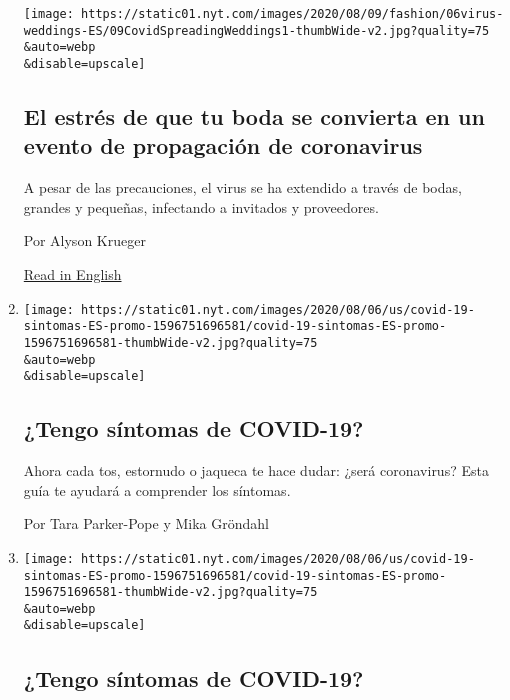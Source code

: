 \begin{enumerate}
  \texttt{[image: https://static01.nyt.com/images/2020/08/09/fashion/06virus-weddings-ES/09CovidSpreadingWeddings1-thumbWide-v2.jpg?quality=75\\\&auto=webp\\\&disable=upscale]}

  \hypertarget{el-estruxe9s-de-que-tu-boda-se-convierta-en-un-evento-de-propagaciuxf3n-de-coronavirus}{%
  \subsection{El estrés de que tu boda se convierta en un evento de
  propagación de
  coronavirus}\label{el-estruxe9s-de-que-tu-boda-se-convierta-en-un-evento-de-propagaciuxf3n-de-coronavirus}}

  A pesar de las precauciones, el virus se ha extendido a través de
  bodas, grandes y pequeñas, infectando a invitados y proveedores.

  Por Alyson Krueger

  \href{https://www.nytimes.com/2020/08/04/fashion/weddings/weddings-as-covid-super-spreaders.html}{Read
  in English}
\item
  \href{/es/interactive/2020/08/06/espanol/ciencia-y-tecnologia/tengo-covid-19-sintomas.html}{}

  \texttt{[image: https://static01.nyt.com/images/2020/08/06/us/covid-19-sintomas-ES-promo-1596751696581/covid-19-sintomas-ES-promo-1596751696581-thumbWide-v2.jpg?quality=75\\\&auto=webp\\\&disable=upscale]}

  \hypertarget{tengo-suxedntomas-de-covid-19-1}{%
  \subsection{¿Tengo síntomas de
  COVID-19?}\label{tengo-suxedntomas-de-covid-19-1}}

  Ahora cada tos, estornudo o jaqueca te hace dudar: ¿será coronavirus?
  Esta guía te ayudará a comprender los síntomas.

  Por Tara Parker-Pope y Mika Gröndahl
\item
  \href{/es/interactive/2020/08/06/espanol/ciencia-y-tecnologia/tengo-covid-19-sintomas.html}{}

  \texttt{[image: https://static01.nyt.com/images/2020/08/06/us/covid-19-sintomas-ES-promo-1596751696581/covid-19-sintomas-ES-promo-1596751696581-thumbWide-v2.jpg?quality=75\\\&auto=webp\\\&disable=upscale]}

  \hypertarget{tengo-suxedntomas-de-covid-19-2}{%
  \subsection{¿Tengo síntomas de
  COVID-19?}\label{tengo-suxedntomas-de-covid-19-2}}


\end{enumerate}
